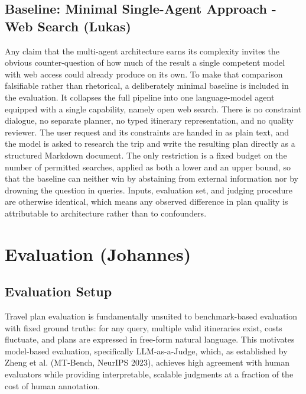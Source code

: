 \documentclass[a4paper,oneside,bibliography=totoc]{scrbook}
\begin{document}
\section{Baseline: Minimal Single-Agent Approach - Web Search (Lukas)}
\label{sec:system:baseline}
Any claim that the multi-agent architecture earns its complexity invites the obvious counter-question of how much of the result a single competent model with web access could already produce on its own. To make that comparison falsifiable rather than rhetorical, a deliberately minimal baseline is included in the evaluation. It collapses the full pipeline into one language-model agent equipped with a single capability, namely open web search. There is no constraint dialogue, no separate planner, no typed itinerary representation, and no quality reviewer. The user request and its constraints are handed in as plain text, and the model is asked to research the trip and write the resulting plan directly as a structured Markdown document. The only restriction is a fixed budget on the number of permitted searches, applied as both a lower and an upper bound, so that the baseline can neither win by abstaining from external information nor by drowning the question in queries. Inputs, evaluation set, and judging procedure are otherwise identical, which means any observed difference in plan quality is attributable to architecture rather than to confounders.



\chapter{Evaluation (Johannes)}
\label{sec:eval}



\section{Evaluation Setup}
\label{sec:eval:setup}
Travel plan evaluation is fundamentally unsuited to benchmark-based evaluation with fixed ground truths: for any query, multiple valid itineraries exist, costs fluctuate, and plans are expressed in free-form natural language. This motivates model-based evaluation, specifically LLM-as-a-Judge, which, as established by Zheng et al. (MT-Bench, NeurIPS 2023), achieves high agreement with human evaluators while providing interpretable, scalable judgments at a fraction of the cost of human annotation.
\end{document}
